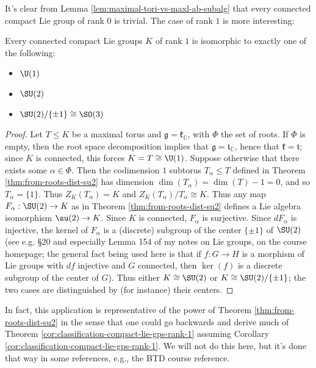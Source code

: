 \documentclass[reqno]{amsart} 
\begin{document}
It's clear from Lemma \ref{lem:maximal-tori-vs-maxl-ab-subalg} that every connected compact Lie group of rank $0$ is trivial.  The case of rank $1$ is more interesting:
\begin{corollary}\label{cor:classification-compact-lie-gps-rank-1}
  Every connected compact Lie groups $K$ of rank $1$ is isomorphic to exactly one of the following:
  \begin{itemize}
  \item $\U(1)$
  \item $\SU(2)$
  \item $\SU(2) / \{\pm 1\} \cong \SO(3)$
  \end{itemize}
\end{corollary}
\begin{proof}
  Let $T \leq K$ be a maximal torus and $\mathfrak{g} = \mathfrak{k}_{\mathbb{C}}$, with $\Phi$ the set of roots.  If $\Phi$ is empty, then the root space decomposition implies that $\mathfrak{g} = \mathfrak{t}_{\mathbb{C}}$, hence that $\mathfrak{k} = \mathfrak{t}$; since $K$ is connected, this forces $K = T \cong \U(1)$.  Suppose otherwise that there exists some $\alpha \in \Phi$.  Then the codimension $1$ subtorus $T_\alpha \leq T$ defined in Theorem \ref{thm:from-roots-dist-su2} has dimension $\dim(T_\alpha) = \dim(T) - 1 = 0$, and so $T_\alpha = \{1\}$.  Thus $Z_K(T_\alpha) = K$ and $Z_K(T_\alpha)/T_\alpha \cong K$.  Thus any map $F_\alpha : \SU(2) \rightarrow K$ as in Theorem \ref{thm:from-roots-dist-su2} defines a Lie algebra isomorphism $\su(2) \rightarrow K$.  Since $K$ is connected, $F_\alpha$ is surjective.  Since $d F_\alpha$ is injective, the kernel of $F_\alpha$ is a (discrete) subgroup of the center $\{\pm 1\}$ of $\SU(2)$ (see e.g. \S20 and especially Lemma 154 of my notes on Lie groups, on the course homepage; the general fact being used here is that if $f : G \rightarrow H$ is a morphism of Lie groups with $d f$ injective and $G$ connected, then $\ker(f)$ is a discrete subgroup of the center of $G$).  Thus either $K \cong \SU(2)$ or $K \cong \SU(2) / \{\pm 1\}$; the two cases are distinguished by (for instance) their centers.
\end{proof}

In fact, this application is representative of the power of Theorem \ref{thm:from-roots-dist-su2} in the sense that one could go backwards and derive much of Theorem \ref{cor:classification-compact-lie-gps-rank-1} assuming Corollary \ref{cor:classification-compact-lie-gps-rank-1}.  We will not do this here, but it's done that way in some references, e.g., the BTD course reference.
\end{document}
